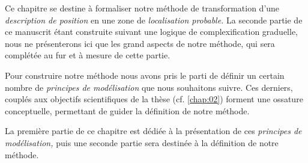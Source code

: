 Ce chapitre se destine à formaliser notre méthode de transformation
d'une \emph{description de position} en une zone de \emph{localisation
probable.} La seconde partie de ce manuscrit étant construite suivant
une logique de complexification graduelle, nous ne présenterons ici
que les grand aspects de notre méthode, qui sera complétée au fur et à
mesure de cette partie.

Pour construire notre méthode nous avons pris le parti de définir un
certain nombre de \emph{principes de modélisation} que nous souhaitons
suivre. Ces derniers, couplés aux objectifs scientifiques de la thèse
(cf. \autoref{chap:02}) forment une ossature conceptuelle, permettant
de guider la définition de notre méthode.

La première partie de ce chapitre est dédiée à la présentation de ces
\emph{principes de modélisation,} puis une seconde partie sera
destinée à la définition de notre méthode.